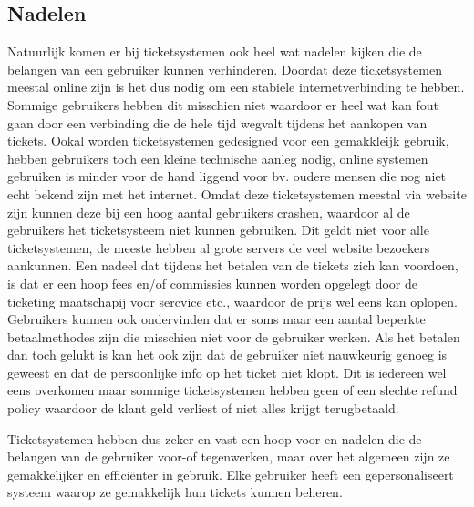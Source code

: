 \subsection{Nadelen}
Natuurlijk komen er bij ticketsystemen ook heel wat nadelen kijken die de belangen van een gebruiker kunnen verhinderen. Doordat deze ticketsystemen meestal online zijn is het dus nodig om een stabiele internetverbinding te hebben.
Sommige gebruikers hebben dit misschien niet waardoor er heel wat kan fout gaan door een verbinding die de hele tijd wegvalt tijdens het aankopen van tickets. Ookal worden ticketsystemen gedesigned voor een gemakkleijk gebruik,
hebben gebruikers toch een kleine technische aanleg nodig, online systemen gebruiken is minder voor de hand liggend voor bv. oudere mensen die nog niet echt bekend zijn met het internet.
Omdat deze ticketsystemen meestal via website zijn kunnen deze bij een hoog aantal gebruikers crashen, waardoor al de gebruikers het ticketsysteem niet kunnen gebruiken. Dit geldt niet voor alle ticketsystemen, de meeste hebben al grote servers de veel website bezoekers aankunnen.
Een nadeel dat tijdens het betalen van de tickets zich kan voordoen, is dat er een hoop fees en/of commissies kunnen worden opgelegt door de ticketing maatschapij voor sercvice etc., waardoor de prijs wel eens kan oplopen. 
Gebruikers kunnen ook ondervinden dat er soms maar een aantal beperkte betaalmethodes zijn die misschien niet voor de gebruiker werken. Als het betalen dan toch gelukt is kan het ook zijn dat de gebruiker niet nauwkeurig genoeg is geweest en dat de persoonlijke info op het ticket niet klopt.
Dit is iedereen wel eens overkomen maar sommige ticketsystemen hebben geen of een slechte refund policy waardoor de klant geld verliest of niet alles krijgt terugbetaald. 

\vspace{10 mm}
Ticketsystemen hebben dus zeker en vast een hoop voor en nadelen die de belangen van de gebruiker voor-of tegenwerken, maar over het algemeen zijn ze gemakkelijker en efficiënter in gebruik. 
Elke gebruiker heeft een gepersonaliseert systeem waarop ze gemakkelijk hun tickets kunnen beheren.
